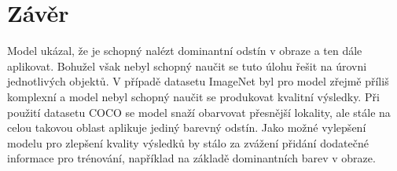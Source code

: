\documentclass[12pt, a4paper]{article}
\begin{document}
    
    \section{Závěr}
    
    Model ukázal, že je schopný nalézt dominantní odstín v obraze a ten dále aplikovat. Bohužel však nebyl schopný naučit se tuto úlohu řešit na úrovni jednotlivých objektů. V případě datasetu ImageNet byl pro model zřejmě příliš komplexní a model nebyl schopný naučit se produkovat kvalitní výsledky. Při použití datasetu COCO se model snaží obarvovat přesnější lokality, ale stále na celou takovou oblast aplikuje jediný barevný odstín. Jako možné vylepšení modelu pro zlepšení kvality výsledků by stálo za zvážení přidání dodatečné informace pro trénování, například na základě dominantních barev v obraze.
    
    \newpage
    
    
    
\end{document}
